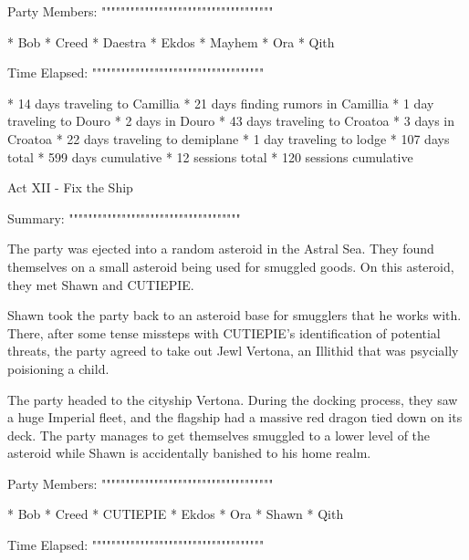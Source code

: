 Party Members:
""""""""""""""""""""""""""""""""""""

  * Bob
  * Creed
  * Daestra
  * Ekdos
  * Mayhem
  * Ora
  * Qith

Time Elapsed:
""""""""""""""""""""""""""""""""""""

  * 14 days traveling to Camillia
  * 21 days finding rumors in Camillia
  * 1 day traveling to Douro
  * 2 days in Douro
  * 43 days traveling to Croatoa
  * 3 days in Croatoa
  * 22 days traveling to demiplane
  * 1 day traveling to lodge
  * 107 days total
  * 599 days cumulative
  * 12 sessions total
  * 120 sessions cumulative

Act XII - Fix the Ship
^^^^^^^^^^^^^^^^^^^^^^^^^^^^^^^^^^^^

Summary:
""""""""""""""""""""""""""""""""""""

The party was ejected into a random asteroid in the Astral Sea.
They found themselves on a small asteroid being used for smuggled goods.
On this asteroid, they met Shawn and CUTIEPIE.

Shawn took the party back to an asteroid base for smugglers that he works with.
There, after some tense missteps with CUTIEPIE's identification of potential threats, the party agreed to take out Jewl Vertona, an Illithid that was psycially poisioning a child.

The party headed to the cityship Vertona.
During the docking process, they saw a huge Imperial fleet, and the flagship had a massive red dragon tied down on its deck.
The party manages to get themselves smuggled to a lower level of the asteroid while Shawn is accidentally banished to his home realm.

Party Members:
""""""""""""""""""""""""""""""""""""

  * Bob
  * Creed
  * CUTIEPIE
  * Ekdos
  * Ora
  * Shawn
  * Qith

Time Elapsed:
""""""""""""""""""""""""""""""""""""

